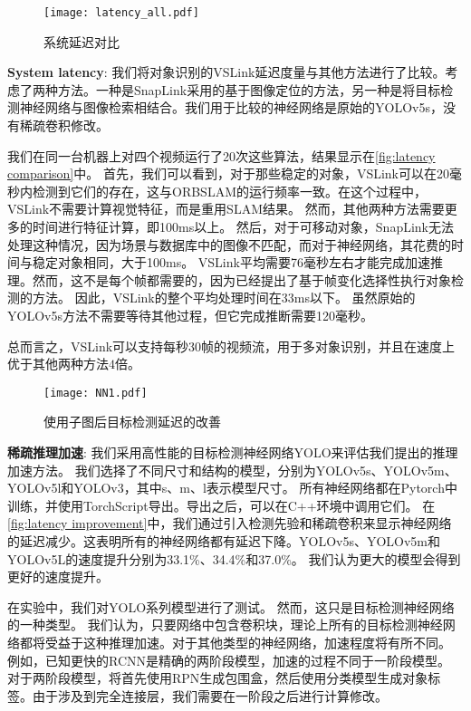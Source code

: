 \begin{figure}[t]
	\centering
	\texttt{[image: latency\_all.pdf]}
	\caption{系统延迟对比}
	\label{fig:latency comparison}
\end{figure}

\textbf{System latency}: 
我们将对象识别的VSLink延迟度量与其他方法进行了比较。考虑了两种方法。一种是SnapLink\cite{chen2018snaplink}采用的基于图像定位的方法，另一种是将目标检测神经网络与图像检索相结合。我们用于比较的神经网络是原始的YOLOv5s\cite{glenn_jocher_2020_4154370}，没有稀疏卷积修改。

我们在同一台机器上对四个视频运行了20次这些算法，结果显示在\autoref{fig:latency comparison}中。
首先，我们可以看到，对于那些稳定的对象，VSLink可以在20毫秒内检测到它们的存在，这与ORBSLAM的运行频率一致。在这个过程中，VSLink不需要计算视觉特征，而是重用SLAM结果。
然而，其他两种方法需要更多的时间进行特征计算，即100ms以上。
然后，对于可移动对象，SnapLink无法处理这种情况，因为场景与数据库中的图像不匹配，而对于神经网络，其花费的时间与稳定对象相同，大于100ms。
VSLink平均需要76毫秒左右才能完成加速推理。然而，这不是每个帧都需要的，因为\cite{yao2020video}已经提出了基于帧变化选择性执行对象检测的方法。
因此，VSLink的整个平均处理时间在33ms以下。
虽然原始的YOLOv5s方法不需要等待其他过程，但它完成推断需要120毫秒。
 
总而言之，VSLink可以支持每秒30帧的视频流，用于多对象识别，并且在速度上优于其他两种方法$4$倍。

\begin{figure}[t]
	\centering
	\texttt{[image: NN1.pdf]}
	\caption{使用子图后目标检测延迟的改善}
	\label{fig:latency improvement}
\end{figure}

\textbf{稀疏推理加速}:
我们采用高性能的目标检测神经网络YOLO\cite{redmon2016you}来评估我们提出的推理加速方法。
我们选择了不同尺寸和结构的模型，分别为YOLOv5s、YOLOv5m、YOLOv5l和YOLOv3，其中s、m、l表示模型尺寸。
所有神经网络都在Pytorch中训练，并使用TorchScript导出。导出之后，可以在C++环境中调用它们。
在\autoref{fig:latency improvement}中，我们通过引入检测先验和稀疏卷积来显示神经网络的延迟减少。这表明所有的神经网络都有延迟下降。YOLOv5s、YOLOv5m和YOLOv5L的速度提升分别为33.1\%、34.4\%和37.0\%。
我们认为更大的模型会得到更好的速度提升。

在实验中，我们对YOLO系列模型进行了测试。
然而，这只是目标检测神经网络的一种类型。
我们认为，只要网络中包含卷积块，理论上所有的目标检测神经网络都将受益于这种推理加速。对于其他类型的神经网络，加速程度将有所不同。
例如，已知更快的RCNN是精确的两阶段模型，加速的过程不同于一阶段模型。
对于两阶段模型，将首先使用RPN生成包围盒，然后使用分类模型生成对象标签。由于涉及到完全连接层，我们需要在一阶段之后进行计算修改。


